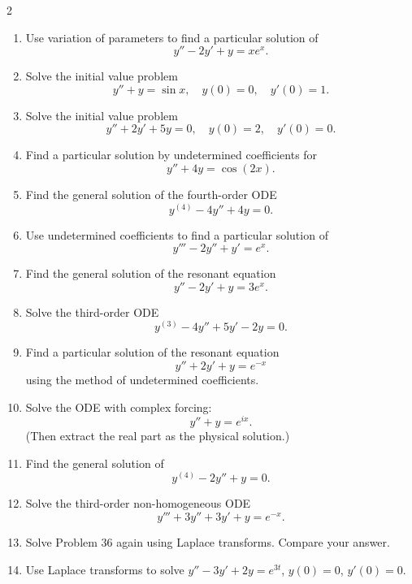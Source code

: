 \begin{multicols}{2}
\begin{enumerate}
  \item Use variation of parameters to find a particular solution of
    \[
    y'' - 2y' + y = xe^x.
    \]
    
  \item Solve the initial value problem
    \[
    y'' + y = \sin x,\quad y(0)=0,\quad y'(0)=1.
    \]
    
  \item Solve the initial value problem
    \[
    y'' + 2y' + 5y = 0,\quad y(0)=2,\quad y'(0)=0.
    \]
    
  \item Find a particular solution by undetermined coefficients for
    \[
    y'' + 4y = \cos(2x).
    \]

  \item Find the general solution of the fourth-order ODE
    \[
    y^{(4)} - 4y'' + 4y = 0.
    \]
    
  \item Use undetermined coefficients to find a particular solution of
    \[
    y''' - 2y'' + y' = e^x.
    \]
    
  \item Find the general solution of the resonant equation
    \[
    y'' - 2y' + y = 3e^x.
    \]
   
  \item Solve the third-order ODE
    \[
    y^{(3)} - 4y'' + 5y' - 2y = 0.
    \]
    
  \item Find a particular solution of the resonant equation
    \[
    y'' + 2y' + y = e^{-x}
    \]
    using the method of undetermined coefficients.
    
  \item Solve the ODE with complex forcing:
    \[
    y'' + y = e^{ix}.
    \]
    (Then extract the real part as the physical solution.)
    
  \item Find the general solution of
    \[
    y^{(4)} - 2y'' + y = 0.
    \]
    
  \item Solve the third-order non-homogeneous ODE
    \[
    y''' + 3y'' + 3y' + y = e^{-x}.
    \]

  \item Solve Problem 36 again using Laplace transforms. Compare your answer.

  \item Use Laplace transforms to solve $y'' - 3y' + 2y = e^{3t}$, $y(0) = 0$, $y'(0) = 0$.


\end{enumerate}
\end{multicols}
